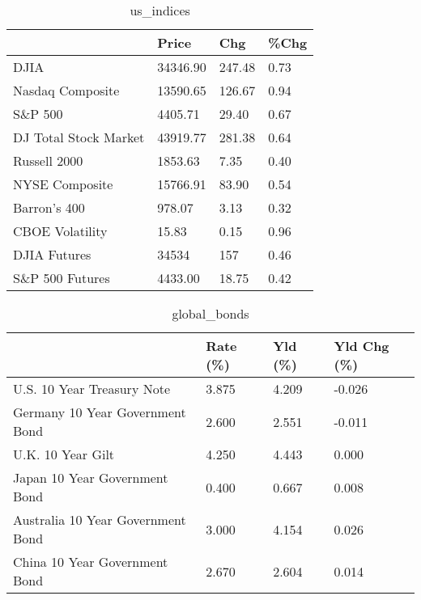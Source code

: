 \documentclass{article}%
\begin{document}
%


\begin{table}[htbp]%
\caption{us\_indices}%
\centering%
\begin{adjustbox}{width=1\textwidth}%
\begin{tabular}{llll}
\toprule
                      &    Price &    Chg & \%Chg \\
\midrule
                 DJIA & 34346.90 & 247.48 & 0.73 \\
     Nasdaq Composite & 13590.65 & 126.67 & 0.94 \\
              S\&P 500 &  4405.71 &  29.40 & 0.67 \\
DJ Total Stock Market & 43919.77 & 281.38 & 0.64 \\
         Russell 2000 &  1853.63 &   7.35 & 0.40 \\
       NYSE Composite & 15766.91 &  83.90 & 0.54 \\
         Barron's 400 &   978.07 &   3.13 & 0.32 \\
      CBOE Volatility &    15.83 &   0.15 & 0.96 \\
         DJIA Futures &    34534 &    157 & 0.46 \\
      S\&P 500 Futures &  4433.00 &  18.75 & 0.42 \\
\bottomrule
\end{tabular}
%
\end{adjustbox}%
\end{table}

%


\begin{table}[htbp]%
\caption{global\_bonds}%
\centering%
\begin{adjustbox}{width=1\textwidth}%
\begin{tabular}{llll}
\toprule
                                  & Rate (\%) & Yld (\%) & Yld Chg (\%) \\
\midrule
       U.S. 10 Year Treasury Note &    3.875 &   4.209 &      -0.026 \\
  Germany 10 Year Government Bond &    2.600 &   2.551 &      -0.011 \\
                U.K. 10 Year Gilt &    4.250 &   4.443 &       0.000 \\
    Japan 10 Year Government Bond &    0.400 &   0.667 &       0.008 \\
Australia 10 Year Government Bond &    3.000 &   4.154 &       0.026 \\
    China 10 Year Government Bond &    2.670 &   2.604 &       0.014 \\
\bottomrule
\end{tabular}
%
\end{adjustbox}%
\end{table}
\end{document}
